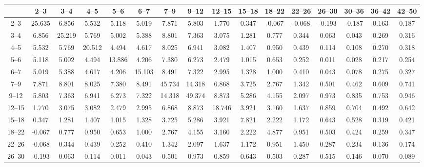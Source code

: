 \begin{table}[tb]
    {\renewcommand{\tabcolsep}{0.1cm} \begin{tabular}{c|ccccccccccccccc}
    \hline
           &   2--3 &   3--4 &   4--5 &   5--6 &   6--7 &   7--9 &  9--12 & 12--15 & 15--18 & 18--22 & 22--26 & 26--30 & 30--36 & 36--42 & 42--50 \\
    \hline
    2--3   & 25.635 &  6.856 &  5.532 &  5.118 &  5.019 &  7.871 &  5.803 &  1.770 &  0.347 & -0.067 & -0.068 & -0.193 & -0.187 &  0.163 &  0.187 \\
    3--4   &  6.856 & 25.219 &  5.769 &  5.002 &  5.388 &  8.801 &  7.363 &  3.075 &  1.281 &  0.777 &  0.344 &  0.063 &  0.043 &  0.269 &  0.316 \\
    4--5   &  5.532 &  5.769 & 20.512 &  4.494 &  4.617 &  8.025 &  6.941 &  3.082 &  1.407 &  0.950 &  0.439 &  0.114 &  0.108 &  0.270 &  0.318 \\
    5--6   &  5.118 &  5.002 &  4.494 & 13.886 &  4.206 &  7.380 &  6.273 &  2.479 &  1.015 &  0.653 &  0.252 &  0.011 &  0.028 &  0.217 &  0.254 \\
    6--7   &  5.019 &  5.388 &  4.617 &  4.206 & 15.103 &  8.491 &  7.322 &  2.995 &  1.328 &  1.000 &  0.410 &  0.043 &  0.078 &  0.275 &  0.327 \\
    7--9   &  7.871 &  8.801 &  8.025 &  7.380 &  8.491 & 45.734 & 14.318 &  6.868 &  3.725 &  2.767 &  1.342 &  0.501 &  0.462 &  0.609 &  0.741 \\
    9--12  &  5.803 &  7.363 &  6.941 &  6.273 &  7.322 & 14.318 & 49.374 &  8.873 &  5.286 &  4.155 &  2.097 &  0.973 &  0.835 &  0.753 &  0.946 \\
    12--15 &  1.770 &  3.075 &  3.082 &  2.479 &  2.995 &  6.868 &  8.873 & 18.746 &  3.921 &  3.160 &  1.637 &  0.859 &  0.704 &  0.492 &  0.642 \\
    15--18 &  0.347 &  1.281 &  1.407 &  1.015 &  1.328 &  3.725 &  5.286 &  3.921 &  7.821 &  2.222 &  1.172 &  0.643 &  0.528 &  0.319 &  0.421 \\
    18--22 & -0.067 &  0.777 &  0.950 &  0.653 &  1.000 &  2.767 &  4.155 &  3.160 &  2.222 &  4.877 &  0.951 &  0.503 &  0.424 &  0.259 &  0.347 \\
    22--26 & -0.068 &  0.344 &  0.439 &  0.252 &  0.410 &  1.342 &  2.097 &  1.637 &  1.172 &  0.951 &  1.450 &  0.287 &  0.234 &  0.136 &  0.174 \\
    26--30 & -0.193 &  0.063 &  0.114 &  0.011 &  0.043 &  0.501 &  0.973 &  0.859 &  0.643 &  0.503 &  0.287 &  0.515 &  0.146 &  0.070 &  0.089 \\

\end{tabular}}
\end{table}
